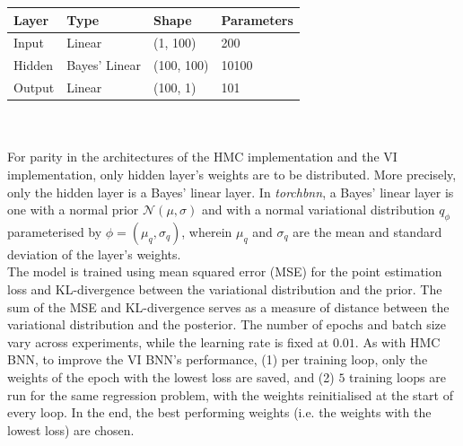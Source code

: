 \documentclass[conference]{IEEEtran}
\begin{document}
\begin{tabular}{| m{1cm} | m{2cm} | m{1.5cm} | m{2cm} |}
    \hline
    \textbf{Layer} & \textbf{Type} & \textbf{Shape} & \textbf{Parameters}\\
    \hline
    Input & Linear & (1, 100) & 200\\
    \hline
    Hidden & Bayes' Linear & (100, 100) & 10100\\
    \hline
    Output & Linear & (100, 1) & 101\\
    \hline
\end{tabular}\\~\\

For parity in the architectures of the HMC implementation and the VI implementation, only hidden layer's weights are to be distributed. More precisely, only the hidden layer is a Bayes' linear layer. In \textit{torchbnn}, a Bayes' linear layer is one with a normal prior $\mathcal{N}(\mu, \sigma)$ and with a normal variational distribution $q_\phi$ parameterised by $\phi = (\mu_q, \sigma_q)$, wherein $\mu_q$ and $\sigma_q$ are the mean and standard deviation of the layer's weights.\\

The model is trained using mean squared error (MSE) for the point estimation loss and KL-divergence between the variational distribution and the prior. The sum of the MSE and KL-divergence serves as a measure of distance between the variational distribution and the posterior. The number of epochs and batch size vary across experiments, while the learning rate is fixed at $0.01$. As with HMC BNN, to improve the VI BNN's performance, (1) per training loop, only the weights of the epoch with the lowest loss are saved, and (2) $5$ training loops are run for the same regression problem, with the weights reinitialised at the start of every loop. In the end, the best performing weights (i.e. the weights with the lowest loss) are chosen.
\end{document}
